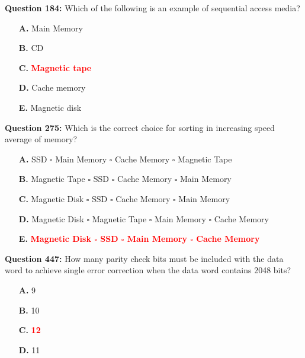 \documentclass[12pt,a4paper]{article}
\begin{document}
\vspace{0.5cm}

\textbf{Question 184:} Which of the following is an example of sequential access media?

\begin{itemize}
    \item[\textbf{A.}] Main Memory
    \item[\textbf{B.}] CD
    \item[\textbf{C.}] \textcolor{red}{\textbf{Magnetic tape}}
    \item[\textbf{D.}] Cache memory
    \item[\textbf{E.}] Magnetic disk
\end{itemize}

\vspace{0.5cm}

\vspace{0.5cm}

\textbf{Question 275:} Which is the correct choice for sorting in increasing speed average of memory?

\begin{itemize}
    \item[\textbf{A.}] SSD $\square$ Main Memory $\square$ Cache Memory $\square$ Magnetic Tape
    \item[\textbf{B.}] Magnetic Tape $\square$ SSD $\square$ Cache Memory $\square$ Main Memory
    \item[\textbf{C.}] Magnetic Disk $\square$ SSD $\square$ Cache Memory $\square$ Main Memory
    \item[\textbf{D.}] Magnetic Disk $\square$ Magnetic Tape $\square$ Main Memory $\square$ Cache Memory
    \item[\textbf{E.}] \textcolor{red}{\textbf{Magnetic Disk $\square$ SSD $\square$ Main Memory $\square$ Cache Memory}}
\end{itemize}

\vspace{0.5cm}

\vspace{0.5cm}

\textbf{Question 447:} How many parity check bits must be included with the data word to achieve single error correction when the data word contains 2048 bits?

\begin{itemize}
    \item[\textbf{A.}] 9
    \item[\textbf{B.}] 10
    \item[\textbf{C.}] \textcolor{red}{\textbf{12}}
    \item[\textbf{D.}] 11
\end{itemize}
\end{document}
